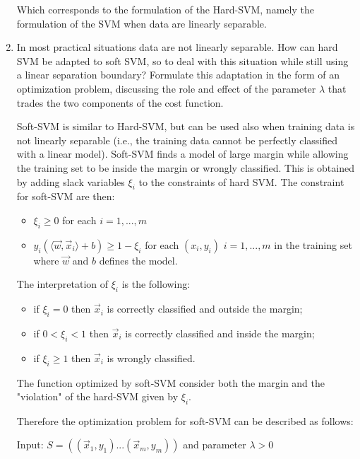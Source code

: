\documentclass[a4paper,11pt,oneside]{book}
\begin{document}
\begin{enumerate}
\begin{solution}
        Which corresponds to the formulation of the Hard-SVM, namely the formulation of the SVM when data are linearly separable.
    \end{solution}
\clearpage
\item In most practical situations data are not linearly separable. How can hard SVM be adapted to soft SVM, so to deal with this situation while still using a linear separation boundary? Formulate this adaptation in the form of an optimization problem, discussing the role and effect of the parameter $\lambda$ that trades the two components of the cost function.
    \begin{solution}
        Soft-SVM is similar to Hard-SVM, but can be used also when training data is not linearly separable (i.e., the training data cannot be perfectly classified with a linear model). Soft-SVM finds a model of large margin while allowing the training set to be inside the margin or wrongly classified. This is obtained by adding slack variables $\xi_i$ to the constraints of hard SVM. The constraint for soft-SVM are then:
        \begin{itemize}
        \item $\xi_i \geq 0$ for each $i = 1,...,m$
        \item $y_i(\langle \vec{w},\vec{x}_i \rangle +b) \geq 1 - \xi_i$ for each $(x_i,y_i)$ $i = 1,...,m$ in the training set where $\vec{w}$ and $b$ defines the model.
        \end{itemize}
        
        The interpretation of $\xi_i$ is the following:
        \begin{itemize}
        \item if $\xi_i = 0$ then $\vec{x}_i$ is correctly classified and outside the margin;
        \item if $0 < \xi_i < 1$ then $\vec{x}_i$ is correctly classified and inside the margin;
        \item if $\xi_i \geq 1$ then $\vec{x}_i$ is wrongly classified.
        \end{itemize}
        
        The function optimized by soft-SVM consider both the margin and the "violation" of the hard-SVM given by $\xi_i$.
        
        Therefore the optimization problem for soft-SVM can be described as follows:
        
        Input: $S = ((\vec{x}_1, y_1) ... (\vec{x}_m, y_m))$ and parameter $\lambda > 0$
        

\end{solution}
\end{enumerate}
\end{document}
